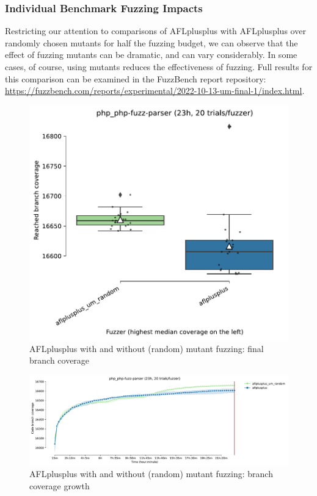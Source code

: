 \subsubsection{Individual Benchmark Fuzzing Impacts}
    
Restricting our attention to comparisons of AFLplusplus with AFLplusplus over randomly chosen mutants for half the fuzzing budget, we can observe that the effect of fuzzing mutants can be dramatic, and can vary considerably.  In some cases, of course, using mutants reduces the effectiveness of fuzzing.  Full results for this comparison can be examined in the FuzzBench report repository: \url{https://fuzzbench.com/reports/experimental/2022-10-13-um-final-1/index.html}.

\begin{figure}
  \includegraphics[width=0.75\columnwidth]{php_php-fuzz-parser_boxplot.pdf}
  \caption{AFLplusplus with and without (random) mutant fuzzing: final branch coverage}
  \label{fig:phpbox}
  
\end{figure}

\begin{figure}
  \includegraphics[width=0.75\columnwidth]{php_php-fuzz-parser_coverage_growth.pdf}
  \caption{AFLplusplus with and without (random) mutant fuzzing: branch coverage growth}
  \label{fig:phpgrowth}  
\end{figure}

